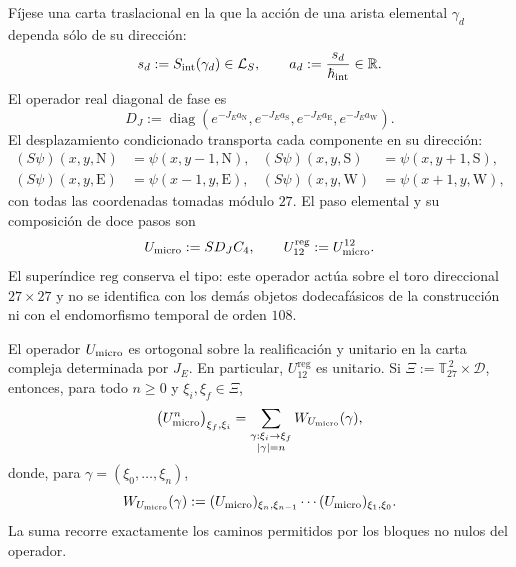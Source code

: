 Fíjese una carta traslacional en la que la acción de una arista elemental
\(\gamma_d\) dependa sólo de su dirección:
\[
 s_d:=S_{\rm int}(\gamma_d)\in\mathcal L_S,
 \qquad
 a_d:=\frac{s_d}{\hbar_{\rm int}}\in\mathbb R.
\]
El operador real diagonal de fase es
\[
 D_J:=\operatorname{diag}
 \left(
  e^{-J_Ea_{\mathrm N}},
  e^{-J_Ea_{\mathrm S}},
  e^{-J_Ea_{\mathrm E}},
  e^{-J_Ea_{\mathrm W}}
 \right).
\]
El desplazamiento condicionado transporta cada componente en su dirección:
\begin{align*}
 (S\psi)(x,y,\mathrm N)&=\psi(x,y-1,\mathrm N),&
 (S\psi)(x,y,\mathrm S)&=\psi(x,y+1,\mathrm S),\\
 (S\psi)(x,y,\mathrm E)&=\psi(x-1,y,\mathrm E),&
 (S\psi)(x,y,\mathrm W)&=\psi(x+1,y,\mathrm W),
\end{align*}
con todas las coordenadas tomadas módulo \(27\). El paso elemental y su
composición de doce pasos son
\begin{equation}
 U_{\rm micro}:=S D_J C_4,
 \qquad
 U_{12}^{\mathrm{reg}}:=U_{\rm micro}^{12}.
 \label{eq:paso-unitario-registro-27-rev3}
\end{equation}
El superíndice \(\mathrm{reg}\) conserva el tipo: este operador actúa sobre
el toro direccional \(27\times27\) y no se identifica con los demás objetos
dodecafásicos de la construcción ni con el endomorfismo temporal de orden \(108\).

\begin{proposition}
\label{prop:unitariedad-suma-registro-27-rev3}
El operador \(U_{\rm micro}\) es ortogonal sobre la realificación y unitario
en la carta compleja determinada por \(J_E\). En particular,
\(U_{12}^{\mathrm{reg}}\) es unitario. Si
\(\Xi:=\mathbb T_{27}^{\,2}\times\mathcal D\), entonces, para todo
\(n\geq0\) y \(\xi_i,\xi_f\in\Xi\),
\[
 \bigl(U_{\rm micro}^{n}\bigr)_{\xi_f,\xi_i}
 =
 \sum_{\substack{\gamma:\xi_i\to\xi_f\\|\gamma|=n}}
 W_{U_{\rm micro}}(\gamma),
\]
donde, para \(\gamma=(\xi_0,\ldots,\xi_n)\),
\[
 W_{U_{\rm micro}}(\gamma)
 :=
 (U_{\rm micro})_{\xi_n,\xi_{n-1}}
 \cdots
 (U_{\rm micro})_{\xi_1,\xi_0}.
\]
La suma recorre exactamente los caminos permitidos por los bloques no nulos
del operador.
\end{proposition}


